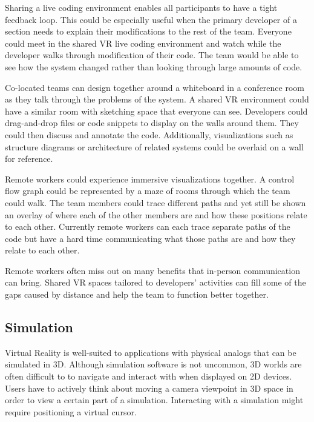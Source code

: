 \documentclass[conference]{IEEEtran}
\begin{document}
Sharing a live coding environment enables all participants to have a tight feedback loop. 
This could be especially useful when the primary developer of a section needs to explain their modifications to the rest of the team. 
Everyone could meet in the shared VR live coding environment and watch while the developer walks through modification of their code. 
The team would be able to see how the system changed rather than looking through large amounts of code.

Co-located teams can design together around a whiteboard in a conference room as they talk through the problems of the system. 
A shared VR environment could have a similar room with sketching space that everyone can see. 
Developers could drag-and-drop files or code snippets to display on the walls around them. 
They could then discuss and annotate the code. 
Additionally, visualizations such as structure diagrams or architecture of related systems could be overlaid on a wall for reference.

Remote workers could experience immersive visualizations together. 
A control flow graph could be represented by a maze of rooms through which the team could walk. 
The team members could trace different paths and yet still be shown an overlay of where each of the other members are and how these positions relate to each other. 
Currently remote workers can each trace separate paths of the code but have a hard time communicating what those paths are and how they relate to each other.

Remote workers often miss out on many benefits that in-person communication can bring. 
Shared VR spaces tailored to developers' activities can fill some of the gaps caused by distance and help the team to function better together. 

\subsection{Simulation}
Virtual Reality is well-suited to applications with physical analogs that can be simulated in 3D. 
Although simulation software is not uncommon, 3D worlds are often difficult to to navigate and interact with when displayed on 2D devices. 
Users have to actively think about moving a camera viewpoint in 3D space in order to view a certain part of a simulation. 
Interacting with a simulation might require positioning a virtual cursor. 
\end{document}

